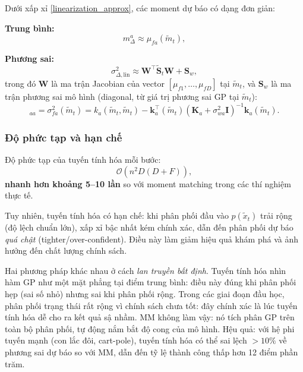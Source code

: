 Dưới xấp xỉ \eqref{linearization_approx}, các moment dự báo có dạng đơn giản:

\textbf{Trung bình:}
\begin{equation}
    m^a_\Delta \approx \mu_{fa}(\tilde{m}_t),
    \label{lin_mean}
\end{equation}

\textbf{Phương sai:}
\begin{equation}
    \sigma^2_{\Delta,\text{lin}} \approx \mathbf{W}^\top \tilde{\mathbf{S}}_t \mathbf{W} + \mathbf{S}_w,
    \label{lin_variance}
\end{equation}
trong đó $\mathbf{W}$ là ma trận Jacobian của vector $[\mu_{f1}, \dots, \mu_{fD}]$ tại $\tilde{m}_t$, và $\mathbf{S}_w$ là ma trận phương sai mô hình (diagonal, từ giá trị phương sai GP tại $\tilde{m}_t$):
\begin{equation}
    [\mathbf{S}_w]_{aa} = \sigma^2_{fa}(\tilde{m}_t) = k_a(\tilde{m}_t, \tilde{m}_t) - \mathbf{k}_a^\top(\tilde{m}_t)(\mathbf{K}_a + \sigma^2_{wa}\mathbf{I})^{-1}\mathbf{k}_a(\tilde{m}_t).
    \label{model_uncertainty_at_mean}
\end{equation}

\subsubsection{Độ phức tạp và hạn chế}
\label{SUB_SUB_SEC_lin_complexity}

Độ phức tạp của tuyến tính hóa mỗi bước:
\begin{equation}
    \mathcal{O}(n^2 D (D+F)),
\end{equation}
\textbf{nhanh hơn khoảng 5--10 lần} so với moment matching trong các thí nghiệm thực tế.

Tuy nhiên, tuyến tính hóa có hạn chế: khi phân phối đầu vào $p(\tilde{x}_t)$ trải rộng (độ lệch chuẩn lớn), xấp xỉ bậc nhất kém chính xác, dẫn đến phân phối dự báo \textit{quá chật} (tighter/over-confident). Điều này làm giảm hiệu quả khám phá và ảnh hưởng đến chất lượng chính sách.
\begin{nx}
\label{NX_mm_vs_lin_intuition}
Hai phương pháp khác nhau ở cách \textit{lan truyền bất định}. Tuyến tính hóa nhìn hàm GP như một mặt phẳng tại điểm trung bình: điều này đúng khi phân phối hẹp (sai số nhỏ) nhưng sai khi phân phối rộng. Trong các giai đoạn đầu học, phân phối trạng thái rất rộng vì chính sách chưa tốt: đây chính xác là lúc tuyến tính hóa dễ cho ra kết quả sậ nhầm. MM không làm vậy: nó tích phân GP trên toàn bộ phân phối, tự động nắm bắt độ cong của mô hình. Hệu quả: với hệ phi tuyến mạnh (con lắc đôi, cart-pole), tuyến tính hóa có thể sai lệch $>10\%$ về phương sai dự báo so với MM, dẫn đến tỹ lệ thành công thấp hơn 12 điểm phần trăm.
\end{nx}
